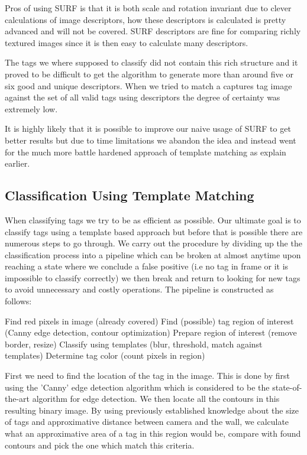 Pros of using SURF is that it is both scale and rotation invariant due to clever calculations of image descriptors, how these descriptors is calculated is pretty advanced and will not be covered. SURF descriptors are fine for comparing richly textured images since it is then easy to calculate many descriptors.

The tags we where supposed to classify did not contain this rich structure and it proved to be difficult to get the algorithm to generate more than around five or six good and unique descriptors. When we tried to match a captures tag image against the set of all valid tags using descriptors the degree of certainty was extremely low. 

It is highly likely that it is possible to improve our naive usage of SURF to get better results but due to time limitations we abandon the idea and instead went for the much more battle hardened approach of template matching as explain earlier.

\subsection{Classification Using Template Matching}
When classifying tags we try to be as efficient as possible. Our ultimate goal is to classify tags using a template based approach but before that is possible there are numerous steps to go through. We carry out the procedure by dividing up the the classification process into a pipeline which can be broken at almost anytime upon reaching a state where we conclude a false positive (i.e no tag in frame or it is impossible to classify correctly) we then break and return to looking for new tags to avoid unnecessary and costly operations. The pipeline is constructed as follows:

Find red pixels in image (already covered)
Find (possible) tag region of interest (Canny edge detection, contour optimization)
Prepare region of interest (remove border, resize)
Classify using templates (blur, threshold, match against templates)
Determine tag color (count pixels in region)

First we need to find the location of the tag in the image. This is done by first using the 'Canny' edge detection algorithm which is considered to be the state-of-the-art algorithm for edge detection. We then locate all the contours in this resulting binary image. By using previously established knowledge about the size of tags and approximative distance between camera and the wall, we calculate what an approximative area of a tag in this region would be, compare with found contours and pick the one which match this criteria. 

